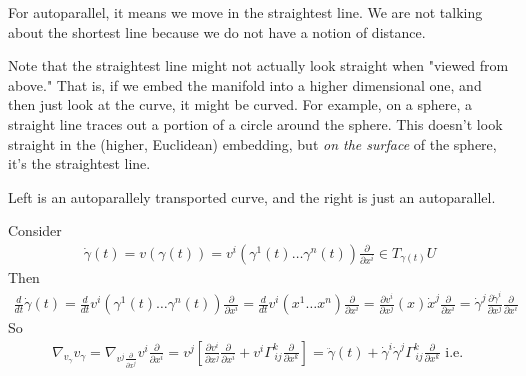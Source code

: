 \documentclass[10pt]{amsart}
\begin{document}
\begin{multicols*}{2}
For autoparallel, it means we move in the straightest line. We are not talking about the shortest line because we do not have a notion of distance.

Note that the straightest line might not actually look straight when "viewed from above." That is, if we embed the manifold into a higher dimensional one, and then just look at the curve, it might be curved. For example, on a sphere, a straight line traces out a portion of a circle around the sphere. This doesn't look straight in the (higher, Euclidean) embedding, but \emph{on the surface} of the sphere, it's the straightest line.

\begin{center}
\end{center}
Left is an autoparallely transported curve, and the right is just an autoparallel.

Consider 
\[
\begin{gathered}
	\dot{\gamma}(t) = v(\gamma(t)) = v^i(\gamma^1(t) \dots \gamma^n(t)) \frac{\partial}{\partial x^i} \in T_{\gamma(t)} U
\end{gathered}\]
Then
\[
\begin{gathered}
	\frac{d}{dt}\dot{\gamma}(t) = \frac{d}{dt} v^i(\gamma^1(t) \dots \gamma^n(t)) \frac{\partial}{\partial x^i} = \frac{d}{dt} v^i(x^1 \dots x^n ) \frac{\partial}{\partial x^i} = \frac{\partial v^i}{\partial x^j}(x) \dot{x}^j \frac{\partial}{\partial x^i} = \dot{\gamma}^j \frac{\partial \dot{\gamma}^i}{\partial x^j} \frac{\partial }{ \partial x^i}
\end{gathered}\]
So
\[
\begin{gathered}
	\nabla_{v_{\gamma}} v_{\gamma} = \nabla_{v^j \frac{\partial}{\partial x^j} } v^i \frac{\partial}{\partial x^i} = v^j \left[ \frac{\partial v^i}{\partial x^j} \frac{\partial}{\partial x^i} + v^i \Gamma^k_{\, ij} \frac{\partial }{\partial x^k} \right] = \ddot{\gamma}(t) + \dot{\gamma}^i \dot{\gamma}^j \Gamma^k_{\, ij} \frac{\partial}{\partial x^k} \text{ i.e. }
\end{gathered}\]


\end{multicols*}
\end{document}
